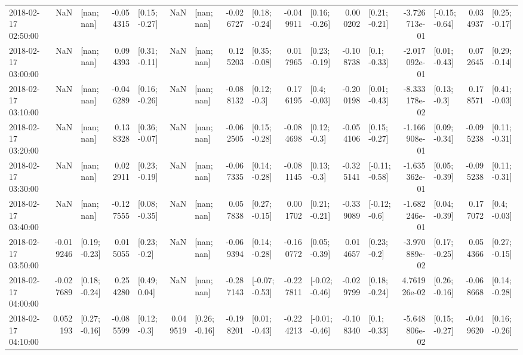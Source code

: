 \begin{tabular}{lrlrlrlrlrlrlrlrl}
2018-02-17 02:50:00 &       NaN &      [nan; nan] & -0.054315 &   [0.15; -0.27] &       NaN &      [nan; nan] & -0.026727 &   [0.18; -0.24] & -0.049911 &   [0.16; -0.26] &  0.000202 &   [0.21; -0.21] & -3.726713e-01 &  [-0.15; -0.64] &  0.034937 &   [0.25; -0.17] \\
2018-02-17 03:00:00 &       NaN &      [nan; nan] &  0.094393 &   [0.31; -0.11] &       NaN &      [nan; nan] &  0.125203 &   [0.35; -0.08] &  0.017965 &   [0.23; -0.19] & -0.108738 &    [0.1; -0.33] & -2.017092e-01 &   [0.01; -0.43] &  0.072645 &   [0.29; -0.14] \\
2018-02-17 03:10:00 &       NaN &      [nan; nan] & -0.046289 &   [0.16; -0.26] &       NaN &      [nan; nan] & -0.088132 &    [0.12; -0.3] &  0.176195 &    [0.4; -0.03] & -0.200198 &   [0.01; -0.43] & -8.333178e-02 &    [0.13; -0.3] &  0.178571 &   [0.41; -0.03] \\
2018-02-17 03:20:00 &       NaN &      [nan; nan] &  0.138328 &   [0.36; -0.07] &       NaN &      [nan; nan] & -0.062505 &   [0.15; -0.28] & -0.084698 &    [0.12; -0.3] & -0.054106 &   [0.15; -0.27] & -1.166908e-01 &   [0.09; -0.34] & -0.095238 &   [0.11; -0.31] \\
2018-02-17 03:30:00 &       NaN &      [nan; nan] &  0.022911 &   [0.23; -0.19] &       NaN &      [nan; nan] & -0.067335 &   [0.14; -0.28] & -0.081145 &    [0.13; -0.3] & -0.325141 &  [-0.11; -0.58] & -1.635362e-01 &   [0.05; -0.39] & -0.095238 &   [0.11; -0.31] \\
2018-02-17 03:40:00 &       NaN &      [nan; nan] & -0.127555 &   [0.08; -0.35] &       NaN &      [nan; nan] &  0.057838 &   [0.27; -0.15] &  0.001702 &   [0.21; -0.21] & -0.339089 &   [-0.12; -0.6] & -1.682246e-01 &   [0.04; -0.39] &  0.177072 &    [0.4; -0.03] \\
2018-02-17 03:50:00 & -0.019246 &   [0.19; -0.23] &  0.015055 &    [0.23; -0.2] &       NaN &      [nan; nan] & -0.069394 &   [0.14; -0.28] & -0.160772 &   [0.05; -0.39] &  0.014657 &    [0.23; -0.2] & -3.970889e-02 &   [0.17; -0.25] &  0.054366 &   [0.27; -0.15] \\
2018-02-17 04:00:00 & -0.027689 &   [0.18; -0.24] &  0.254280 &    [0.49; 0.04] &       NaN &      [nan; nan] & -0.287143 &  [-0.07; -0.53] & -0.227811 &  [-0.02; -0.46] & -0.029799 &   [0.18; -0.24] &  4.761926e-02 &   [0.26; -0.16] & -0.068668 &   [0.14; -0.28] \\
2018-02-17 04:10:00 &  0.052193 &   [0.27; -0.16] & -0.085599 &    [0.12; -0.3] &  0.049519 &   [0.26; -0.16] & -0.198201 &   [0.01; -0.43] & -0.224213 &  [-0.01; -0.46] & -0.108340 &    [0.1; -0.33] & -5.648806e-02 &   [0.15; -0.27] & -0.049620 &   [0.16; -0.26] \\

\end{tabular}
